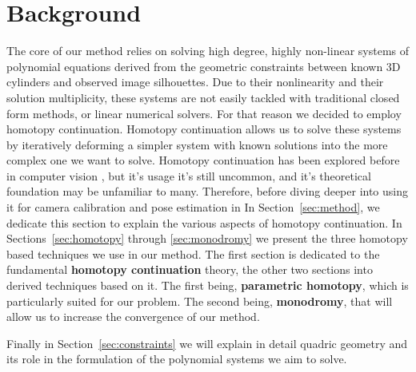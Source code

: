 \section{Background}
The core of our method relies on solving high degree, highly non-linear systems of polynomial equations derived from the geometric constraints between known 3D cylinders and observed image silhouettes. Due to their nonlinearity and their solution multiplicity, these systems are not easily tackled with traditional closed form methods, or linear numerical solvers. For that reason we decided to employ homotopy continuation. Homotopy continuation allows us to solve these systems by iteratively deforming a simpler system with known solutions into the more complex one we want to solve.
Homotopy continuation has been explored before in computer vision \cite{chien2021gpubasedhomotopycontinuationminimal}, but it's usage it's still uncommon, and it's theoretical foundation may be unfamiliar to many. Therefore, before diving deeper into using it for camera calibration and pose estimation in In Section~\ref{sec:method}, we dedicate this section to explain the various aspects of homotopy continuation.
In Sections~\ref{sec:homotopy} through \ref{sec:monodromy} we present the three homotopy based techniques we use in our method. The first section is dedicated to the fundamental \textbf{homotopy continuation} theory, the other two sections into derived techniques based on it. The first being, \textbf{parametric homotopy}, which is particularly suited for our problem. The second being, \textbf{monodromy}, that will allow us to increase the convergence of our method.

Finally in Section~\ref{sec:constraints} we will explain in detail quadric geometry and its role in the formulation of the polynomial systems we aim to solve.



